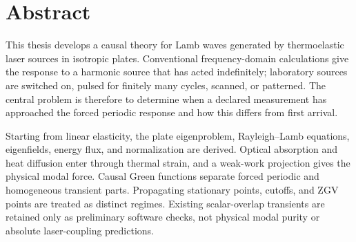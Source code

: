 \chapter*{Abstract}
This thesis develops a causal theory for Lamb waves generated by thermoelastic
laser sources in isotropic plates. Conventional frequency-domain calculations
give the response to a harmonic source that has acted indefinitely; laboratory
sources are switched on, pulsed for finitely many cycles, scanned, or patterned.
The central problem is therefore to determine when a declared measurement has
approached the forced periodic response and how this differs from first arrival.

Starting from linear elasticity, the plate eigenproblem, Rayleigh--Lamb equations,
eigenfields, energy flux, and normalization are derived. Optical absorption and
heat diffusion enter through thermal strain, and a weak-work projection gives
the physical modal force. Causal Green functions separate forced periodic and
homogeneous transient parts. Propagating stationary points, cutoffs, and ZGV
points are treated as distinct regimes. Existing scalar-overlap transients are
retained only as preliminary software checks, not physical modal purity or
absolute laser-coupling predictions.
